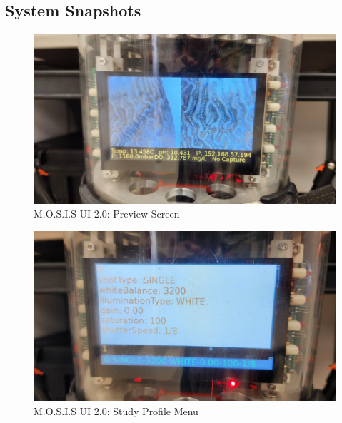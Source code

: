 \subsection{System Snapshots}
\begin{figure}[H]
  \begin{center}
  \includegraphics[width=\textwidth]{../Appendix/Design_Documentation/System_Snapshots/Figures/Preview_Screen.jpeg}
  \end{center}
  \caption{M.O.S.I.S UI 2.0: Preview Screen}
\end{figure}
\begin{figure}[H]
  \begin{center}
  \includegraphics[width=\textwidth]{../Appendix/Design_Documentation/System_Snapshots/Figures/Study_Profile_Select.jpeg}
  \end{center}
  \caption{M.O.S.I.S UI 2.0: Study Profile Menu}
\end{figure}
